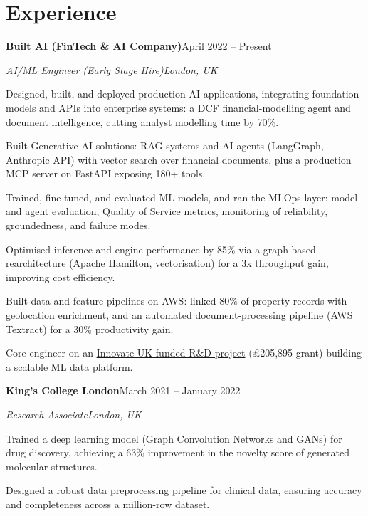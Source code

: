 \documentclass[10pt,a4paper]{article}
\newcommand{\entry}[4]{%
  {\color{company}\bfseries #1}\hfill {\color{muted}#2}\par
  \vspace{1pt}
  {\itshape #3}\hfill {\color{muted}\itshape #4}\par
  \vspace{3pt}%
}
\begin{document}
\section{Experience}
\entry{Built AI (FinTech \& AI Company)}{April 2022 -- Present}{AI/ML Engineer (Early Stage Hire)}{London, UK}
\begin{tight}
  \item Designed, built, and deployed production AI applications, integrating foundation models and APIs into enterprise systems: a DCF financial-modelling agent and document intelligence, cutting analyst modelling time by 70\%.
  \item Built Generative AI solutions: RAG systems and AI agents (LangGraph, Anthropic API) with vector search over financial documents, plus a production MCP server on FastAPI exposing 180+ tools.
  \item Trained, fine-tuned, and evaluated ML models, and ran the MLOps layer: model and agent evaluation, Quality of Service metrics, monitoring of reliability, groundedness, and failure modes.
  \item Optimised inference and engine performance by 85\% via a graph-based rearchitecture (Apache Hamilton, vectorisation) for a 3x throughput gain, improving cost efficiency.
  \item Built data and feature pipelines on AWS: linked 80\% of property records with geolocation enrichment, and an automated document-processing pipeline (AWS Textract) for a 30\% productivity gain.
  \item Core engineer on an \href{https://gtr.ukri.org/projects?ref=10022996}{Innovate UK funded R\&D project} (\pounds205,895 grant) building a scalable ML data platform.
\end{tight}

\entry{King's College London}{March 2021 -- January 2022}{Research Associate}{London, UK}
\begin{tight}
  \item Trained a deep learning model (Graph Convolution Networks and GANs) for drug discovery, achieving a 63\% improvement in the novelty score of generated molecular structures.
  \item Designed a robust data preprocessing pipeline for clinical data, ensuring accuracy and completeness across a million-row dataset.
\end{tight}

\end{document}
